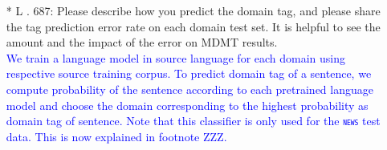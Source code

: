 \documentclass[12pt,times,a4paper,twoside]{article}
\newcommand{\fyTodo}[1]{\Todo[FY:]{\textcolor{orange}{#1}}}
\theoremstyle{definition}
\newcommand{\domain}[1]{\texttt{\textsc{#1}}}
\begin{document}
\begin{itemize}
\item[* L]. 687: Please describe how you predict the domain tag, and please share the tag prediction error rate on each domain test set. It is helpful to see the amount and the impact of the error on MDMT results.
\\
\textcolor{blue}{We train a language model in source language for each domain using respective source training corpus. To predict domain tag of a sentence, we compute probability of the sentence according to each pretrained language model and choose the domain corresponding to the highest probability as domain tag of sentence. Note that this classifier is only used for the \domain{news} test data. This is now explained in footnote ZZZ.}\fyTodo{to compute error rate of domain prediction over each test set, check comment, add footnote number.}
\end{itemize}
\end{document}
